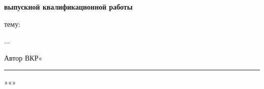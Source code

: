 \documentclass[../thesis.tex]{subfiles}
\begin{document}
\thispagestyle{empty}

\begin{center}
    \noindent\textbf{\ministry}
    
    \noindent\textbf{\universityone}\linebreak
    \textbf{\universitytwo}\linebreak
    \textbf{\universitythree}
    
    \bigskip
    
    \noindent\titleboldcaps{\abstracttitle}
    
    \noindent\textbf{выпускной квалификационной работы}
    
    \bigskip
    
    \noindent\underline{\myfullnamewhos}
    
    \bigskip
    
     тему: \thesisname
\end{center}

...

\vfill

\noindent Автор ВКР\hspace{3cm}«\rule{3cm}{0.4pt}»\hspace{0.5cm}«\underline{\myfullname}»
\end{document}
